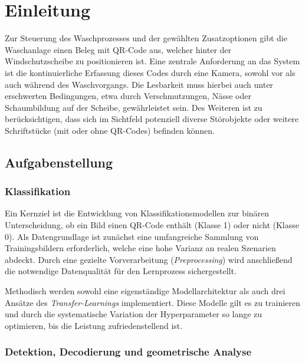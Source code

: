\documentclass[
    a4paper,        %
    11pt,           %
    ngerman,        %
    parskip=half,   %
    listof=totoc,   %
    bibliography=totoc %
]{scrartcl}
\let\oldsection\section
\renewcommand\section{\clearpage\oldsection}
\begin{document}

\section{Einleitung} \label{sec:einleitung}

Zur Steuerung des Waschprozesses und der gewählten Zusatzoptionen gibt die Waschanlage einen Beleg mit QR-Code aus, welcher hinter der Windschutzscheibe zu positionieren ist. Eine zentrale Anforderung an das System ist die kontinuierliche Erfassung dieses Codes durch eine Kamera, sowohl vor als auch während des Waschvorgangs. Die Lesbarkeit muss hierbei auch unter erschwerten Bedingungen, etwa durch Verschmutzungen, Nässe oder Schaumbildung auf der Scheibe, gewährleistet sein. Des Weiteren ist zu berücksichtigen, dass sich im Sichtfeld potenziell diverse Störobjekte oder weitere Schriftstücke (mit oder ohne QR-Codes) befinden können.
%
\subsection{Aufgabenstellung} \label{subsec:aufgabenstellung}

\subsubsection{Klassifikation} \label{subsubsec:aufgabenstellung_klassifikation}

Ein Kernziel ist die Entwicklung von Klassifikationsmodellen zur binären Unterscheidung, ob ein Bild einen QR-Code enthält (Klasse 1) oder nicht (Klasse 0). Als Datengrundlage ist zunächst eine umfangreiche Sammlung von Trainingsbildern erforderlich, welche eine hohe Varianz an realen Szenarien abdeckt. Durch eine gezielte Vorverarbeitung (\textit{Preprocessing}) wird anschließend die notwendige Datenqualität für den Lernprozess sichergestellt.

Methodisch werden sowohl eine eigenständige Modellarchitektur als auch drei Ansätze des \textit{Transfer-Learnings} implementiert. Diese Modelle gilt es zu trainieren und durch die systematische Variation der Hyperparameter so lange zu optimieren, bis die Leistung zufriedenstellend ist.

\subsubsection{Detektion, Decodierung und geometrische Analyse} \label{subsubsec:aufgabenstellung_detektion_decodierung_geometrie}
\end{document}
